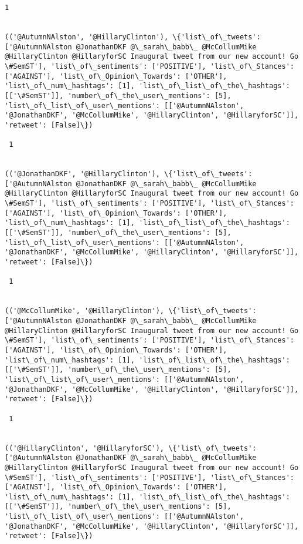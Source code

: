 \documentclass[11pt]{article}
\begin{document}
\begin{Verbatim}[commandchars=\\\{\}]
 1
 

(('@AutumnNAlston', '@HillaryClinton'), \{'list\_of\_tweets': ['@AutumnNAlston @JonathanDKF @\_sarah\_babb\_ @McCollumMike @HillaryClinton @HillaryforSC Inaugural tweet from our new account! Go \#SemST'], 'list\_of\_sentiments': ['POSITIVE'], 'list\_of\_Stances': ['AGAINST'], 'list\_of\_Opinion\_Towards': ['OTHER'], 'list\_of\_num\_hashtags': [1], 'list\_of\_list\_of\_the\_hashtags': [['\#SemST']], 'number\_of\_the\_user\_mentions': [5], 'list\_of\_list\_of\_user\_mentions': [['@AutumnNAlston', '@JonathanDKF', '@McCollumMike', '@HillaryClinton', '@HillaryforSC']], 'retweet': [False]\})

 1
 

(('@JonathanDKF', '@HillaryClinton'), \{'list\_of\_tweets': ['@AutumnNAlston @JonathanDKF @\_sarah\_babb\_ @McCollumMike @HillaryClinton @HillaryforSC Inaugural tweet from our new account! Go \#SemST'], 'list\_of\_sentiments': ['POSITIVE'], 'list\_of\_Stances': ['AGAINST'], 'list\_of\_Opinion\_Towards': ['OTHER'], 'list\_of\_num\_hashtags': [1], 'list\_of\_list\_of\_the\_hashtags': [['\#SemST']], 'number\_of\_the\_user\_mentions': [5], 'list\_of\_list\_of\_user\_mentions': [['@AutumnNAlston', '@JonathanDKF', '@McCollumMike', '@HillaryClinton', '@HillaryforSC']], 'retweet': [False]\})

 1
 

(('@McCollumMike', '@HillaryClinton'), \{'list\_of\_tweets': ['@AutumnNAlston @JonathanDKF @\_sarah\_babb\_ @McCollumMike @HillaryClinton @HillaryforSC Inaugural tweet from our new account! Go \#SemST'], 'list\_of\_sentiments': ['POSITIVE'], 'list\_of\_Stances': ['AGAINST'], 'list\_of\_Opinion\_Towards': ['OTHER'], 'list\_of\_num\_hashtags': [1], 'list\_of\_list\_of\_the\_hashtags': [['\#SemST']], 'number\_of\_the\_user\_mentions': [5], 'list\_of\_list\_of\_user\_mentions': [['@AutumnNAlston', '@JonathanDKF', '@McCollumMike', '@HillaryClinton', '@HillaryforSC']], 'retweet': [False]\})

 1
 

(('@HillaryClinton', '@HillaryforSC'), \{'list\_of\_tweets': ['@AutumnNAlston @JonathanDKF @\_sarah\_babb\_ @McCollumMike @HillaryClinton @HillaryforSC Inaugural tweet from our new account! Go \#SemST'], 'list\_of\_sentiments': ['POSITIVE'], 'list\_of\_Stances': ['AGAINST'], 'list\_of\_Opinion\_Towards': ['OTHER'], 'list\_of\_num\_hashtags': [1], 'list\_of\_list\_of\_the\_hashtags': [['\#SemST']], 'number\_of\_the\_user\_mentions': [5], 'list\_of\_list\_of\_user\_mentions': [['@AutumnNAlston', '@JonathanDKF', '@McCollumMike', '@HillaryClinton', '@HillaryforSC']], 'retweet': [False]\})


\end{Verbatim}
\end{document}

